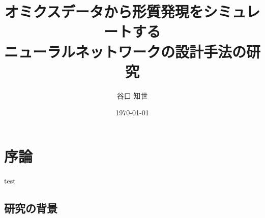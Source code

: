 \documentclass[a4paper,12pt]{jsreport}
\begin{document}
\title{
	オミクスデータから形質発現をシミュレートする\\ニューラルネットワークの設計手法の研究
}
\author{谷口 知世}
\date{\today}
\maketitle
\tableofcontents



\chapter{序論}
test


\section{研究の背景}
\end{document}
